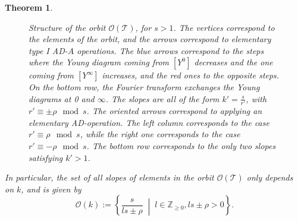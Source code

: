 \documentclass[10pt,a4paper]{amsart}
\newtheorem{theorem}{Theorem}
\begin{document}
\begin{theorem}
\begin{figure}[h]
\caption{Structure of the orbit $\mathcal O(\mathcal T)$, for $s>1$. The vertices correspond to the elements of the orbit, and the arrows correspond to elementary type I AD-$A$ operations. The blue arrows correspond to the steps where the Young diagram coming from $[Y^0]$ decreases and the one coming from $[Y^\infty]$ increases, and the red ones to the opposite steps.  On the bottom row, the Fourier transform exchanges the Young diagrams at 0 and $\infty$.  The slopes are all of the form $k'=\frac{s}{r'}$, with $r'\equiv \pm \rho \mod s$. The oriented arrows correspond to applying an elementary AD-operation. The left column corresponds to the case $r'\equiv \rho \mod s$, while the right one corresponds to the case $r'\equiv -\rho \mod s$. The bottom row corresponds to the only two slopes satisfying $k'>1$.}
\label{fig:structure_orbit}
\end{figure}


In particular, the set of all slopes of elements in the orbit $\mathcal O(\mathcal T)$ only depends on $k$, and is given by
\begin{equation}
\label{eq:form_slopes_orbit}
\mathcal O(k):=\left\lbrace \frac{s}{ls\pm \rho} \;\middle \vert\; l\in \mathbb Z_{\geq 0}, ls\pm \rho>0 \right\rbrace.
\end{equation}


\end{theorem}
\end{document}
